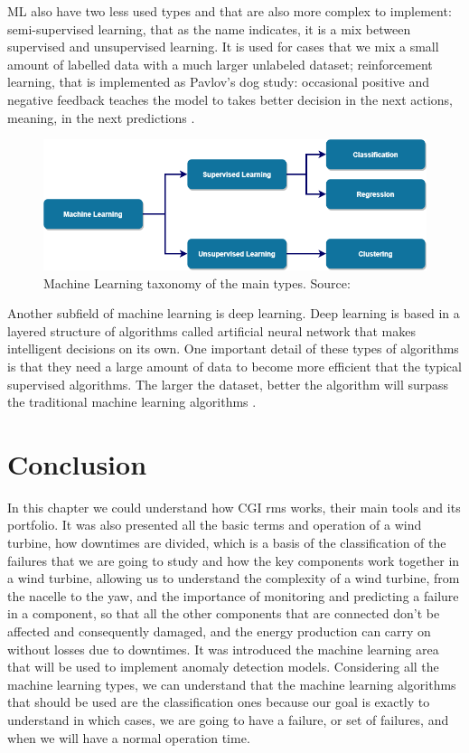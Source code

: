 ML also have two less used types and that are also more complex to implement: semi-supervised learning, that as the name indicates, it is a mix between supervised and unsupervised learning. It is used for cases that we mix a small amount of labelled data with a much larger unlabeled dataset; reinforcement learning, that is implemented as Pavlov’s dog study: occasional positive and negative feedback teaches the model to takes better decision in the next actions, meaning, in the next predictions \cite{46_ML}.

\begin{figure}[htbp]
	\centering
	\includegraphics[width=\textwidth]{Chapters/Figures/background_fig9.PNG}
	\caption{Machine Learning taxonomy of the main types. Source: \cite{FCT_AA} }
	\label{fig:Figuras_Tree_silhouettes-vectorial}
\end{figure}

Another subfield of machine learning is deep learning. Deep learning is based in a layered structure of algorithms called artificial neural network that makes intelligent decisions on its own. One important detail of these types of algorithms is that they need a large amount of data to become more efficient that the typical supervised algorithms. The larger the dataset, better the algorithm will surpass the traditional machine learning algorithms \cite{ML_Deep_Learning_2} \cite{ML_Deep_Learning}.


\section{Conclusion} 
\label{sub:if_you_use_this_template} 

In this chapter we could understand how CGI \acrshort{rms} works, their main tools and its portfolio. It was also presented all the basic terms and operation of a wind turbine, how downtimes are divided, which is a basis of the classification of the failures that we are going to study and how the key components work together in a wind turbine, allowing us to understand the complexity of a wind turbine, from the nacelle to the yaw, and the importance of monitoring and predicting a failure in a component, so that all the other components that are connected don't be affected and consequently damaged, and the energy production can carry on without losses due to downtimes. It was introduced the machine learning area that will be used to implement anomaly detection models. Considering all the machine learning types, we can understand that the machine learning algorithms that should be used are the classification ones because our goal is exactly to understand in which cases, we are going to have a failure, or set of failures, and when we will have a normal operation time.
